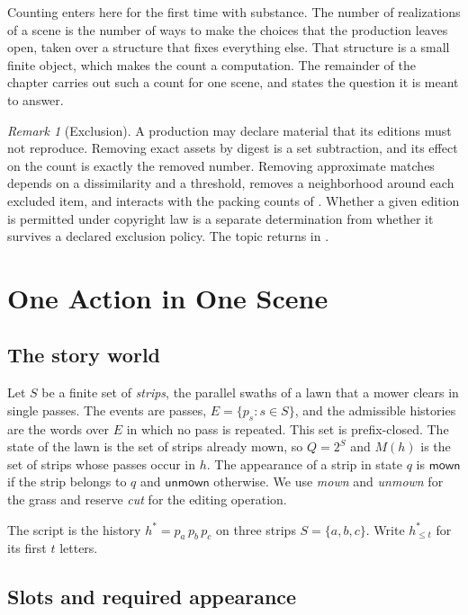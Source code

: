 \documentclass[11pt,twoside,openright]{book}
\theoremstyle{plain}
\theoremstyle{definition}
\theoremstyle{remark}
\newtheorem{remark}[theorem]{Remark}
\newcommand{\mown}{\mathsf{mown}}
\newcommand{\unmown}{\mathsf{unmown}}
\begin{document}
Counting enters here for the first time with substance. The number of realizations of a scene is the number of ways to make the choices that the production leaves open, taken over a structure that fixes everything else. That structure is a small finite object, which makes the count a computation. The remainder of the chapter carries out such a count for one scene, and  states the question it is meant to answer.

\begin{remark}[Exclusion]\label{rem:exclusion}
A production may declare material that its editions must not reproduce. Removing exact assets by digest is a set subtraction, and its effect on the count is exactly the removed number. Removing approximate matches depends on a dissimilarity and a threshold, removes a neighborhood around each excluded item, and interacts with the packing counts of . Whether a given edition is permitted under copyright law is a separate determination from whether it survives a declared exclusion policy. The topic returns in .
\end{remark}

\section{One Action in One Scene}\label{sec:lawn}

\subsection{The story world}

Let $S$ be a finite set of \emph{strips}, the parallel swaths of a lawn that a mower clears in single passes. The events are passes, $E=\{p_s:s\in S\}$, and the admissible histories are the words over $E$ in which no pass is repeated. This set is prefix-closed. The state of the lawn is the set of strips already mown, so $Q=2^S$ and $M(h)$ is the set of strips whose passes occur in $h$. The appearance of a strip in state $q$ is $\mown$ if the strip belongs to $q$ and $\unmown$ otherwise. We use \emph{mown} and \emph{unmown} for the grass and reserve \emph{cut} for the editing operation.

The script is the history $h^\ast=p_a\,p_b\,p_c$ on three strips $S=\{a,b,c\}$. Write $h^\ast_{\le t}$ for its first $t$ letters.

\subsection{Slots and required appearance}
\end{document}
